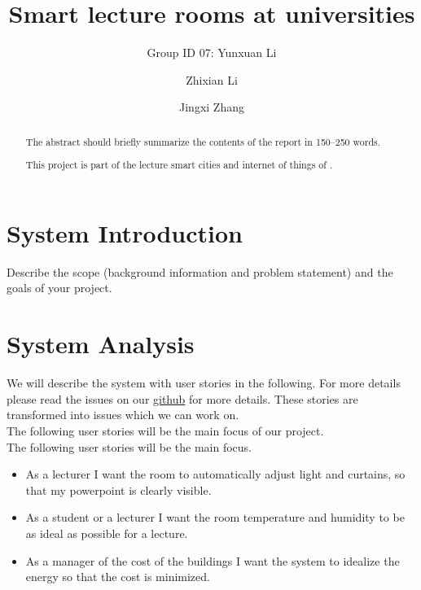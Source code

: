 \documentclass[runningheads]{llncs}
\begin{document}
%
\title{Smart lecture rooms at universities}

\author{Group ID 07: Yunxuan Li \and
Zhixian Li \and
Jingxi Zhang}

%
\maketitle              %
%
\begin{abstract}
The abstract should briefly summarize the contents of the report in
150--250 words.

This project is part of the lecture smart cities and internet of things of \cite{ref_url1}. 

\end{abstract}
%
%
%
\section{System Introduction}
Describe the scope (background information and problem statement) and the goals of your project.

\section{System Analysis}
We will describe the system with user stories in the following. For more details please read the issues on our \href{https://github.com/Jinaz/scaiot-project/issues}{github} for more details. These stories are transformed into issues which we can work on.\\

The following user stories will be the main focus of our project.\\

The following user stories will be the main focus.\\
\begin{itemize}
\item As a lecturer I want the room to automatically adjust light and curtains, so that my powerpoint is clearly visible.\\

\item As a student or a lecturer I want the room temperature and humidity to be as ideal as possible for a lecture.\\

\item As a manager of the cost of the buildings I want the system to idealize the energy so that the cost is minimized.\\
\end{itemize}
\end{document}
